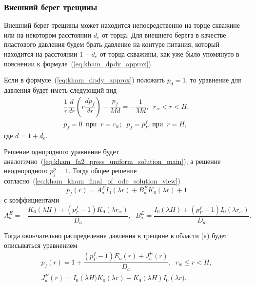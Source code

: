 \documentclass{article}
\newcommand{\mysub}[1]{%
  \par\vspace{0.5em}\noindent{\normalsize\underline{#1}}\par\vspace{0.5em}%
}
\begin{document}
\subsubsection{Внешний берег трещины}
Внешний берег трещины может находится непосредственно на торце скважине или на некотором расстоянии $d_e$ от торца. Для внешнего берега в качестве пластового давления будем брать давление на контуре питания, который находится на расстоянии $1+d_e$ от торца скважины, как уже было упомянуто в пояснении к формуле~(\ref{eq:kham_dpdy_approx}).

\mysub{Подобласть (а) $r_w \leq x < H$}
Если в формуле~(\ref{eq:kham_dpdy_approx}) положить $p_d=1$, то уравнение для давления будет иметь следующий вид
\begin{equation}
\displaystyle
\begin{gathered}
\dfrac{1}{r}\dfrac{d}{dr}\left(r\dfrac{d p_f}{dr}\right) - \dfrac{p_f}{Md} = - \dfrac{1}{Md} , \;\; r_w < r < H;    \\[8pt]
p_f = 0 \;\; \text{при} \;\; r = r_w; \;\; p_f = p^f_{\Gamma} \;\; \text{при} \;\; r = H,
\end{gathered}
\label{eq:kham_fract_outer_area_a_press_main}
\end{equation}
где $d = 1 + d_e$.

Решение однородного уравнение будет аналогично~(\ref{eq:kham_fa2_press_uniform_solution_main}), а решение неоднородного $p_f^p = 1$.
Тогда общее решение согласно~(\ref{eq:kham_kham_final_pf_ode_solution_view})
\begin{equation}
\displaystyle
p_f(r) = A_a^E I_0\left(\lambda r\right) + B_a^E K_0\left(\lambda r\right) + 1
\label{eq:kham_fract_outer_pa}
\end{equation}
с коэффициентами
\begin{equation}
\displaystyle
A_a^E = - \dfrac{K_0 \left(\lambda H \right) + \left( p^f_{\Gamma} - 1 \right) K_0 \left( \lambda r_w \right)}{D_a}, \;\;
B_a^E = \dfrac{I_0 \left( \lambda H \right) + \left(p^f_{\Gamma} - 1 \right) I_0 \left(\lambda r_w \right) }{D_a}.
\label{eq:kham_fract_outer_pa_cf_AB}
\end{equation}

Тогда окончательно распределение давления в трещине в области (а) будет описываться уравнением
\begin{equation}
\displaystyle
\begin{gathered}
p_f\left(r\right) = 1 + \dfrac{\left(p^f_{\Gamma}-1\right) E_a \left(r\right) + J_a^E\left(r\right)}{D_a}, \;\; r_w \leq r < H, \\
J_a^E(r) = I_0 \left(\lambda H) K_0 \left(\lambda r\right) - K_0 \left(\lambda H\right) I_0 \left(\lambda r).
\end{gathered}
\label{eq:kham_fract_outer_final_sol_pf_radial}
\end{equation}
\end{document}
